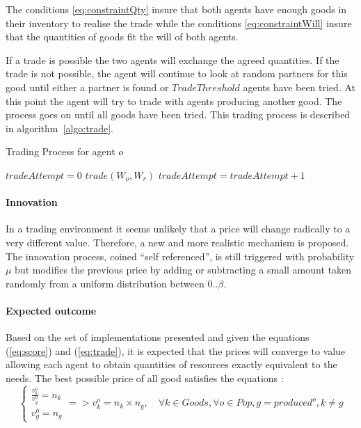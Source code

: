 \documentclass{wscpaperproc}
\begin{document}
The conditions \ref{eq:constraintQty} insure that both agents have enough goods in their inventory to realise the trade while the conditions \ref{eq:constraintWill} insure that the quantities of goods fit the will of both agents.



If a trade is possible the two agents will exchange the agreed quantities. If the trade is not possible, the agent will continue to look at random partners for this good until either a partner is found or $TradeThreshold$ agents have been tried. At this point the agent will try to trade with agents producing another good. The process goes on until all goods have been tried. This trading process is described in algorithm~\ref{algo:trade}.

\begin{algorithm}
\caption{Trading Process for agent $o$}
\label{algo:trade}
	\begin{algorithmic}[1]
	\scriptsize
			\State $tradeAttempt = 0$
					\State $trade(W_o,W_r)$
				\Else
					\State $tradeAttempt = tradeAttempt + 1$					
				\EndIf
			\EndFor
		\EndFor
\end{algorithmic}
\end{algorithm}


\paragraph{Innovation} In a trading environment it seems unlikely that a price will change radically to a very different value. Therefore, a new and more realistic mechanism is proposed. The innovation process, coined ``self referenced'', is still triggered with probability $\mu$ 
but modifies the previous price by adding or subtracting a small amount taken randomly from a uniform  distribution between $0 .. \beta$.


\paragraph{Expected outcome} 

Based on the set of implementations presented and given the equations (\ref{eq:score}) and (\ref{eq:trade}), it is expected that the prices will converge to value allowing each agent to obtain quantities of resources exactly equivalent to the needs. The best possible price of all good satisfies the equations :
\begin{equation}
	\begin{cases}
		\frac{v^o_k}{v^o_g} = n_k \\
		v^o_g = n_g 
	\end{cases} =>v^o_k = n_k \times n_g, \quad \forall k \in Goods, \forall o \in Pop, g = produced^o, k \not= g 
\end{equation}
\end{document}
